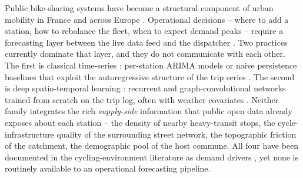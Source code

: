 \documentclass[11pt,a4paper]{article}
\begin{document}
Public bike-sharing systems have become a structural component of
urban mobility in France and across Europe \citep{Pucher2010,Buehler2012}.
Operational decisions -- where to add a station, how to rebalance
the fleet, when to expect demand peaks -- require a forecasting
layer between the live data feed and the dispatcher
\citep{Forma2015,Raviv2013}.  Two practices currently dominate
that layer, and they do not communicate with each other.  The
first is classical time-series : per-station ARIMA models or naive
persistence baselines that exploit the autoregressive structure of
the trip series \citep{Box1976,Hyndman2008}.  The second is deep
spatio-temporal learning : recurrent and graph-convolutional
networks trained from scratch on the trip log, often with weather
covariates \citep{Lin2018,Wang2021}.  Neither family integrates
the rich \emph{supply-side} information that public open data
already exposes about each station -- the density of nearby
heavy-transit stops, the cycle-infrastructure quality of the
surrounding street network, the topographic friction of the
catchment, the demographic pool of the host commune.  All four
have been documented in the cycling-environment literature as
demand drivers
\citep{Heinen2010,Schoner2014,Parkin2008,Rietveld2004,FaghihImani2014},
yet none is routinely available to an operational forecasting
pipeline.
\end{document}
